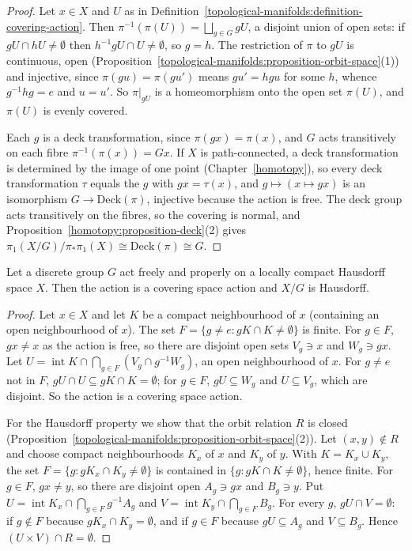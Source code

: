\begin{proof}
Let $x \in X$ and $U$ as in Definition~\ref{topological-manifolds:definition-covering-action}. Then $\pi^{-1}(\pi(U)) = \bigsqcup_{g \in G}gU$, a disjoint union of open sets: if $gU \cap hU \neq \emptyset$ then $h^{-1}gU \cap U \neq \emptyset$, so
$g = h$. The restriction of $\pi$ to $gU$ is continuous, open (Proposition~\ref{topological-manifolds:proposition-orbit-space}(1)) and injective, since $\pi(gu) = \pi(gu')$ means $gu' = hgu$ for some $h$, whence
$g^{-1}hg = e$ and $u = u'$. So $\pi|_{gU}$ is a homeomorphism onto the open set $\pi(U)$, and $\pi(U)$ is evenly covered.

Each $g$ is a deck transformation, since $\pi(gx) = \pi(x)$, and $G$ acts transitively on each fibre $\pi^{-1}(\pi(x)) = Gx$. If $X$ is path-connected, a deck transformation is determined by the image of one point
(Chapter~\ref{homotopy}), so every deck transformation $\tau$ equals the $g$ with $gx = \tau(x)$, and $g \mapsto (x \mapsto gx)$ is an isomorphism $G \to \mathrm{Deck}(\pi)$, injective because the action is free.
The deck group acts transitively on the fibres, so the covering is normal, and Proposition~\ref{homotopy:proposition-deck}(2) gives $\pi_1(X/G)/\pi_*\pi_1(X) \cong \mathrm{Deck}(\pi) \cong G$.
\end{proof}

\begin{theorem}\label{topological-manifolds:theorem-proper-free}
Let a discrete group $G$ act freely and properly on a locally compact Hausdorff space $X$. Then the action is a covering space action and $X/G$ is Hausdorff.
\end{theorem}

\begin{proof}
Let $x \in X$ and let $K$ be a compact neighbourhood of $x$ (containing an open neighbourhood of $x$). The set $F = \{g \neq e : gK \cap K \neq \emptyset\}$ is finite. For $g \in F$, $gx \neq x$ as the action is free, so there are
disjoint open sets $V_g \ni x$ and $W_g \ni gx$. Let $U = \operatorname{int}K \cap \bigcap_{g \in F}(V_g \cap g^{-1}W_g)$, an open neighbourhood of $x$. For $g \neq e$ not in $F$, $gU \cap U \subseteq gK \cap K = \emptyset$; for $g \in F$,
$gU \subseteq W_g$ and $U \subseteq V_g$, which are disjoint. So the action is a covering space action.

For the Hausdorff property we show that the orbit relation $R$ is closed (Proposition~\ref{topological-manifolds:proposition-orbit-space}(2)). Let $(x, y) \notin R$ and choose compact neighbourhoods $K_x$ of $x$ and $K_y$ of $y$. With
$K = K_x \cup K_y$, the set $F = \{g : gK_x \cap K_y \neq \emptyset\}$ is contained in $\{g : gK \cap K \neq \emptyset\}$, hence finite. For $g \in F$, $gx \neq y$, so there are disjoint open $A_g \ni gx$ and $B_g \ni y$. Put
$U = \operatorname{int}K_x \cap \bigcap_{g \in F}g^{-1}A_g$ and $V = \operatorname{int}K_y \cap \bigcap_{g \in F}B_g$. For every $g$, $gU \cap V = \emptyset$: if $g \notin F$ because $gK_x \cap K_y = \emptyset$, and if $g \in F$ because
$gU \subseteq A_g$ and $V \subseteq B_g$. Hence $(U \times V) \cap R = \emptyset$.
\end{proof}

